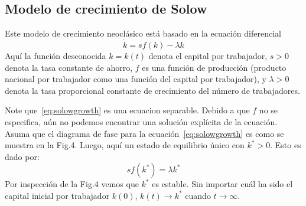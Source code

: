 \subsection{Modelo de crecimiento de Solow}
\begin{example}
Este modelo de crecimiento neoclásico está basado en la ecuación diferencial
\begin{equation}\label{eq:solowgrowth}
\dot{k}=sf\left(k\right)-\lambda k
\end{equation}
Aquí la función desconocida $k=k(t)$ denota el capital por trabajador, $s>0$ denota la tasa constante de ahorro, $f$ es una función de producción (producto nacional por trabajador como una función del capital por trabajador), y $\lambda>0$ denota la tasa proporcional constante de crecimiento del número de trabajadores.
\end{example}

Note que~\eqref{eq:solowgrowth} es una ecuacion separable. Debido a que $f$ no se especifica, aún no podemos encontrar una solución explícita de la ecuación. Asuma que el diagrama de fase para la ecuación~\eqref{eq:solowgrowth} es como se muestra en la Fig.4. %
Luego, aquí un estado de equilibrio único con $k^{\ast}>0$. Esto es dado por:
\begin{equation}
sf\left(k^{\ast}\right)=\lambda k^{\ast}
\end{equation}
Por inspección de la Fig.4 vemos que $k^{\ast}$ es estable. Sin importar cuál ha sido el capital inicial por trabajador $k\left(0\right)$, $k\left(t\right)\rightarrow k^{\ast}$ cuando $t\rightarrow\infty$.


